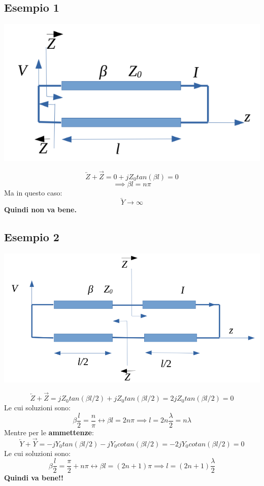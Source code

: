 \subsection{Esempio 1}
\begin{center}
    \includegraphics[width=.5\textwidth]{Images/figure33.png}
\end{center}
\begin{equation*}
    \overleftarrow{Z} + \overrightarrow{Z} = 0 + j Z_0 tan(\beta l) = 0
\end{equation*}
\begin{equation*}
    \implies \beta l = n\pi
\end{equation*}
Ma in questo caso:
\begin{equation*}
    \overleftarrow{Y} \longrightarrow \infty
\end{equation*}
\textbf{Quindi non va bene.}
\subsection{Esempio 2}
\begin{center}
    \includegraphics[width=.5\textwidth]{Images/figure34.png}
\end{center}
\begin{equation*}
    \overleftarrow{Z} + \overrightarrow{Z} = j Z_0 tan(\beta l/2) + j Z_0 tan(\beta l/2) = 2 j Z_0 tan(\beta l/2) = 0
\end{equation*}
Le cui soluzioni sono:
\begin{equation*}
    \beta  \frac{l}{2} = \frac{n}{\pi} \leftrightarrow \beta l = 2n\pi \implies l = 2n\frac{\lambda}{2} = n \lambda
\end{equation*}
Mentre per le \textbf{ammettenze}:
\begin{equation*}
    \overleftarrow{Y} + \overrightarrow{Y} = - j Y_0 tan(\beta l/2) - j Y_0 cotan(\beta l/2) = - 2 j Y_0 cotan(\beta l/2) = 0
\end{equation*}
Le cui soluzioni sono:
\begin{equation*}
    \beta  \frac{l}{2} = \frac{\pi}{2} + n\pi \leftrightarrow \beta l = (2n+1) \pi \implies l = (2n+1) \frac{\lambda}{2} 
\end{equation*}
\textbf{Quindi va bene!!}